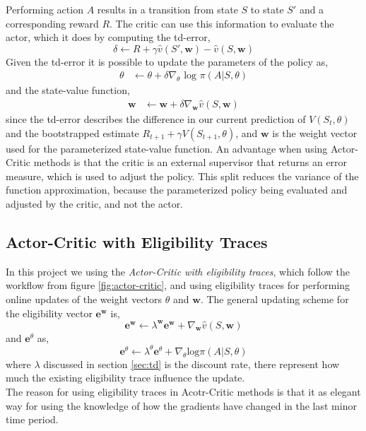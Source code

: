 \documentclass[11pt]{article}
\begin{document}
Performing action $A$ results in a transition from state $S$ to state $S'$ and a corresponding reward $R$. The critic can use this information to evaluate the actor, which it does by computing the td-error,
\begin{equation}
    \delta \leftarrow R + \gamma \hat{v} (S', \mathbf{w}) - \hat{v}(S, \mathbf{w})
\end{equation}
Given the td-error it is possible to update the parameters of the policy as,
\begin{equation}
\begin{split}
    \theta &\leftarrow \theta + \delta \nabla_{\theta} \text{ log } \pi(A | S, \theta)
\end{split}
\end{equation}
and the state-value function,
\begin{equation}
\begin{split}
    \mathbf{w} &\leftarrow \mathbf{w} + \delta \nabla_{\mathbf{w}} \hat{v}(S, \mathbf{w})
\end{split}
\end{equation}
since the td-error describes the difference in our current prediction of 
$V(S_{t}, \theta)$ and the bootstrapped estimate $R_{t+1} + \gamma 
V(S_{t+1}, \theta)$, and $\mathbf{w}$ is the weight vector used for the parameterized state-value function.
An advantage when using Actor-Critic methods is that the critic is an external supervisor that returns an error measure, which is used to adjust the policy. This split reduces the variance of the function approximation, because the parameterized policy being evaluated and adjusted by the critic\cite{actCrit}, and not the actor. 


\subsection{Actor-Critic with Eligibility Traces}

In this project we using the \textit{Actor-Critic with eligibility traces}, which follow the workflow from figure \ref{fig:actor-critic}, and using eligibility traces for performing online updates of the weight vectors $\theta$ and $\mathbf{w}$. The general updating scheme for the eligibility vector $\mathbf{e}^{\mathbf{w}}$ is,
\begin{equation}
    \mathbf{e}^{\mathbf{w}} \leftarrow \lambda^{\mathbf{w}} \mathbf{e}^{\mathbf{w}} + \nabla_{\mathbf{w}} \hat{v}(S, \mathbf{w})
\end{equation}
and $\mathbf{e}^{\theta}$ as,
\begin{equation}
    \mathbf{e}^{\theta} \leftarrow \lambda^{\theta} \mathbf{e}^{\theta} + \nabla_{\theta} \text{log} \pi (A | S, \theta)
\end{equation}
where $\lambda$ discussed in section \ref{sec:td} is the discount rate, there represent how much the existing eligibility trace influence the update.
\\
The reason for using eligibility traces in Acotr-Critic methods is that it as elegant way for using the knowledge of how the gradients have changed in the last minor time period.
\end{document}
